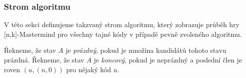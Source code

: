 







 





\subsubsection{Strom algoritmu}
V této sekci definujeme takzvaný strom algoritmu, který zobrazuje průběh hry [n,k]-Mastermind pro všechny tajné kódy v případě pevně zvoleného algoritmu. 

\begin{definice}\label{kandidat}
  Řekneme, že stav $A$ je \emph{prázdný}, pokud je množina kandidátů tohoto stavu prázdná. Řekneme, že stav $A$ je \emph{koncový}, pokud je neprázdný a poslední člen je roven $(u,(n,0))$ pro nějaký kód $u$.
\end{definice}

